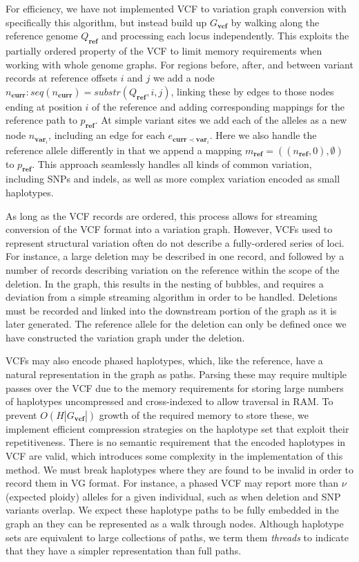 For efficiency, we have not implemented VCF to variation graph conversion with specifically this algorithm, but instead build up $G_\textbf{vcf}$ by walking along the reference genome $Q_\textbf{ref}$ and processing each locus independently.
This exploits the partially ordered property of the VCF to limit memory requirements when working with whole genome graphs.
For regions before, after, and between variant records at reference offsets $i$ and $j$ we add a node $n_\textbf{curr} : seq(n_\textbf{curr}) = substr(Q_\textbf{ref}, i, j)$, linking these by edges to those nodes ending at position $i$ of the reference and adding corresponding mappings for the reference path to $p_\textbf{ref}$.
At simple variant sites we add each of the alleles as a new node $n_{\textbf{var}_i}$, including an edge for each $e_{\textbf{curr} \prec \textbf{var}_i}$.
Here we also handle the reference allele differently in that we append a mapping $m_\textbf{ref} = ((n_\textbf{ref}, 0), \emptyset)$ to $p_\textbf{ref}$.
This approach seamlessly handles all kinds of common variation, including SNPs and indels, as well as more complex variation encoded as small haplotypes.

As long as the VCF records are ordered, this process allows for streaming conversion of the VCF format into a variation graph.
However, VCFs used to represent structural variation often do not describe a fully-ordered series of loci.
For instance, a large deletion may be described in one record, and followed by a number of records describing variation on the reference within the scope of the deletion.
In the graph, this results in the nesting of bubbles, and requires a deviation from a simple streaming algorithm in order to be handled.
Deletions must be recorded and linked into the downstream portion of the graph as it is later generated.
The reference allele for the deletion can only be defined once we have constructed the variation graph under the deletion.

VCFs may also encode phased haplotypes, which, like the reference, have a natural representation in the graph as paths.
Parsing these may require multiple passes over the VCF due to the memory requirements for storing large numbers of haplotypes uncompressed and cross-indexed to allow traversal in RAM.
To prevent $O(H|G_\textbf{vcf}|)$ growth of the required memory to store these, we implement efficient compression strategies on the haplotype set that exploit their repetitiveness.
There is no semantic requirement that the encoded haplotypes in VCF are valid, which introduces some complexity in the implementation of this method.
We must break haplotypes where they are found to be invalid in order to record them in VG format.
For instance, a phased VCF may report more than $\nu$ (expected ploidy) alleles for a given individual, such as when deletion and SNP variants overlap.
We expect these haplotype paths to be fully embedded in the graph an they can be represented as a walk through nodes.
Although haplotype sets are equivalent to large collections of paths, we term them \emph{threads} to indicate that they have a simpler representation than full paths.

